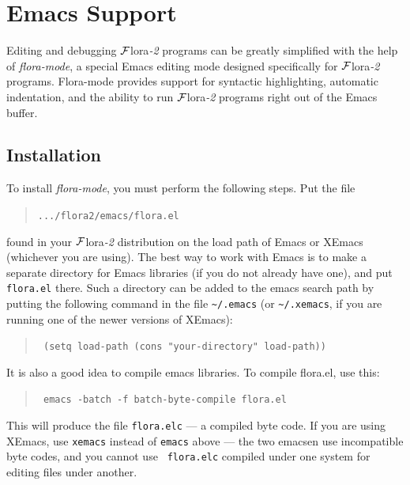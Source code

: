 \documentclass[11pt]{article}
\newcommand{\FLORA}{{\mbox{\sc ${\cal F}${lora}\rm\emph{-2}}}\xspace}
\begin{document}


\newpage
\section{Emacs Support}

Editing and debugging \FLORA programs can be greatly simplified with the
help of \emph{flora-mode}, a special Emacs editing mode designed
specifically for \FLORA programs. Flora-mode provides support for syntactic
highlighting, automatic indentation, and the ability to run \FLORA programs
right out of the Emacs buffer.


\subsection{Installation}


To install \emph{flora-mode}, you must perform the following steps. Put the
file
\begin{quote}
  {\tt .../flora2/emacs/flora.el} 
\end{quote}
found in your \FLORA distribution on the load path of Emacs or XEmacs
(whichever you are using). The best way to work with Emacs is to make a
separate directory for Emacs libraries (if you do not already have one), and put
{\tt flora.el} there. Such a directory can be added to the emacs search path by
putting the following command in the file \verb|~/.emacs| (or
\verb|~/.xemacs|, if you are running one of the newer versions of XEmacs):
\begin{quote}
  \tt
   (setq load-path (cons "your-directory" load-path)) 
\end{quote}
It is also a good idea to compile emacs libraries. To compile flora.el,
use this:
\begin{quote}
  \tt
   emacs -batch -f batch-byte-compile flora.el 
\end{quote}
This will produce the file {\tt flora.elc} --- a compiled byte code.
If you are using XEmacs, use {\tt xemacs} instead of {\tt emacs} above ---
the two emacsen use incompatible byte codes, and you cannot use {\tt
  flora.elc} compiled under one system for editing files under another.
\end{document}
